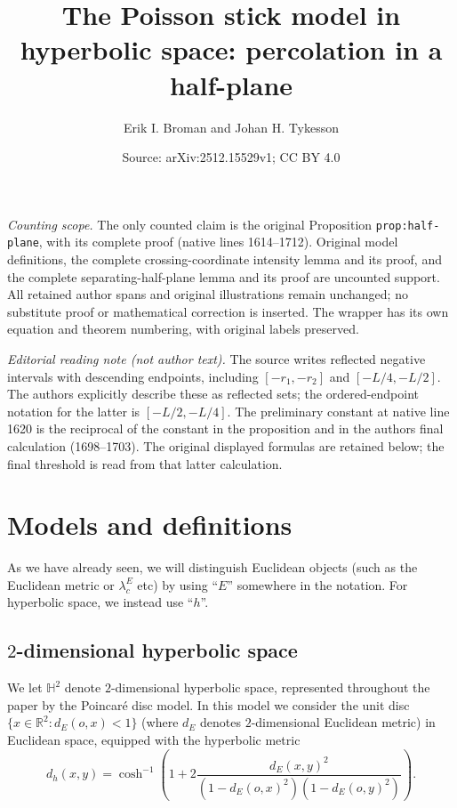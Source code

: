 \documentclass[10pt,a4paper]{amsart}
\title{The Poisson stick model in hyperbolic space: percolation in a half-plane}
\author{Erik I. Broman and Johan H. Tykesson}
\date{Source: arXiv:2512.15529v1; CC BY 4.0}
\newcommand{\BH}{{\mathbb{H}}}
\newcommand{\BR}{{\mathbb{R}}}
\begin{document}
\maketitle
\noindent\textit{Counting scope.} The only counted claim is the original Proposition \texttt{prop:half-plane}, with its complete proof (native lines 1614--1712). Original model definitions, the complete crossing-coordinate intensity lemma and its proof, and the complete separating-half-plane lemma and its proof are uncounted support. All retained author spans and original illustrations remain unchanged; no substitute proof or mathematical correction is inserted. The wrapper has its own equation and theorem numbering, with original labels preserved.
\par\medskip
\noindent\textit{Editorial reading note (not author text).} The source writes reflected negative intervals with descending endpoints, including $[-r_1,-r_2]$ and $[-L/4,-L/2]$. The authors explicitly describe these as reflected sets; the ordered-endpoint notation for the latter is $[-L/2,-L/4]$. The preliminary constant at native line 1620 is the reciprocal of the constant in the proposition and in the authors\textquotesingle{} final calculation (1698--1703). The original displayed formulas are retained below; the final threshold is read from that latter calculation. 
\par\medskip
\section{Models and definitions} \label{sec:modelsanddef}
As we have already seen, we will distinguish Euclidean objects (such as the 
Euclidean metric or $\lambda_c^E$ etc) by using ``$E$'' somewhere in the notation. 
For hyperbolic space, we instead use ``$h$''.


\subsection{$2$-dimensional hyperbolic space} \label{sec:2dhyp}
We let $\BH^2$ denote $2$-dimensional hyperbolic space, represented throughout the paper 
by the Poincar\'e disc model. In this model we consider the unit disc 
$\{x\in \BR^2: d_E(o,x)<1\}$ 
(where $d_E$ denotes $2$-dimensional Euclidean metric) in Euclidean space,
equipped with the hyperbolic metric 
\[
d_h(x,y)=\cosh^{-1}\left(1+2\frac{d_E(x,y)^2}{(1-d_E(o,x)^2)(1-d_E(o,y)^2)}\right).
\]
\end{document}

